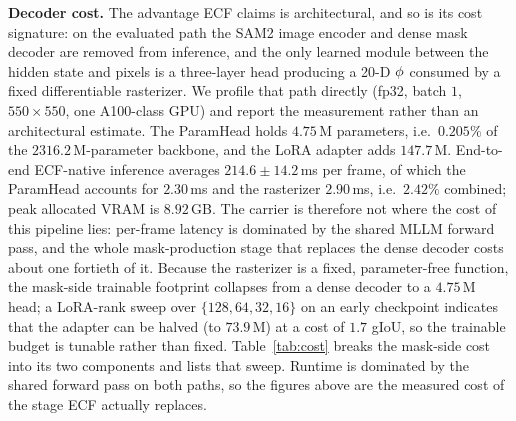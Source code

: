 \textbf{Decoder cost.}
The advantage ECF claims is architectural, and so is its cost signature: on the evaluated path the SAM2 image encoder and dense mask decoder are removed from inference, and the only learned module between the \Seg{} hidden state and pixels is a three-layer head producing a 20-D $\phi$ consumed by a fixed differentiable rasterizer.
We profile that path directly (fp32, batch $1$, $550{\times}550$, one A100-class GPU) and report the measurement rather than an architectural estimate.
The ParamHead holds $4.75$\,M parameters, i.e.\ $0.205\%$ of the $2316.2$\,M-parameter backbone, and the LoRA adapter adds $147.7$\,M.
End-to-end ECF-native inference averages $214.6 \pm 14.2$\,ms per frame, of which the ParamHead accounts for $2.30$\,ms and the rasterizer $2.90$\,ms, i.e.\ $2.42\%$ combined; peak allocated VRAM is $8.92$\,GB.
The carrier is therefore not where the cost of this pipeline lies: per-frame latency is dominated by the shared MLLM forward pass, and the whole mask-production stage that replaces the dense decoder costs about one fortieth of it.
Because the rasterizer is a fixed, parameter-free function, the mask-side trainable footprint collapses from a dense decoder to a $4.75$\,M head; a LoRA-rank sweep over $\{128,64,32,16\}$ on an early checkpoint indicates that the adapter can be halved (to $73.9$\,M) at a cost of $1.7$ gIoU, so the trainable budget is tunable rather than fixed.
Table~\ref{tab:cost} breaks the mask-side cost into its two components and lists that sweep.
Runtime is dominated by the shared forward pass on both paths, so the figures above are the measured cost of the stage ECF actually replaces.

